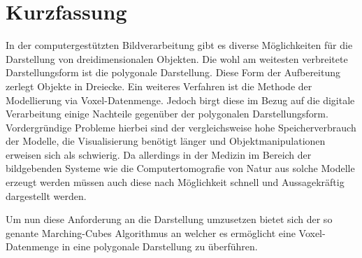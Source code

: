 
\chapter{Kurzfassung}

In der computergestützten Bildverarbeitung gibt es diverse Möglichkeiten für die Darstellung von dreidimensionalen Objekten. Die wohl am weitesten verbreitete Darstellungsform ist die polygonale Darstellung. Diese Form der Aufbereitung zerlegt Objekte in Dreiecke. Ein weiteres Verfahren ist die Methode der Modellierung via Voxel-Datenmenge. Jedoch birgt diese im Bezug auf die digitale Verarbeitung einige Nachteile gegenüber der polygonalen Darstellungsform. Vordergründige Probleme hierbei sind der vergleichsweise hohe Speicherverbrauch der Modelle, die Visualisierung benötigt länger und Objektmanipulationen erweisen sich als schwierig. Da allerdings in der Medizin im Bereich der bildgebenden Systeme wie die Computertomografie von Natur aus solche Modelle erzeugt werden müssen auch diese nach Möglichkeit schnell und Aussagekräftig dargestellt werden.

Um nun diese Anforderung an die Darstellung umzusetzen bietet sich der so genante Marching-Cubes Algorithmus an welcher es ermöglicht eine Voxel-Datenmenge in eine polygonale Darstellung zu überführen. 
